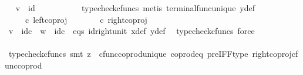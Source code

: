 \begin{isabellebody}
\ \isamarkupfalse%
\ {\isachardoublequoteopen}v\ {\isacharequal}{\kern0pt}\ id\ {\isasymone}{\isachardoublequoteclose}\isanewline
\ \ \ \ \ \ \ \ \isamarkupfalse%
\ {\isacharparenleft}{\kern0pt}typecheck{\isacharunderscore}{\kern0pt}cfuncs{\isacharcomma}{\kern0pt}\ metis\ terminal{\isacharunderscore}{\kern0pt}func{\isacharunderscore}{\kern0pt}unique\ y{\isacharunderscore}{\kern0pt}def{\isacharparenright}{\kern0pt}\isanewline
\ \ \ \ \ \ \isamarkupfalse%
\ \isamarkupfalse%
\ {\isachardoublequoteopen}{\isasymlangle}{\isasymt}{\isacharcomma}{\kern0pt}\ {\isasymt}{\isasymrangle}\ {\isasymamalg}{\isasymlangle}{\isasymf}{\isacharcomma}{\kern0pt}\ {\isasymf}{\isasymrangle}\ {\isasymcirc}\isactrlsub c\ left{\isacharunderscore}{\kern0pt}coproj\ {\isasymone}\ {\isasymone}\ {\isacharequal}{\kern0pt}\ {\isasymlangle}{\isasymt}{\isacharcomma}{\kern0pt}\ {\isasymt}{\isasymrangle}\ {\isasymamalg}{\isasymlangle}{\isasymf}{\isacharcomma}{\kern0pt}\ {\isasymf}{\isasymrangle}\ {\isasymcirc}\isactrlsub c\ right{\isacharunderscore}{\kern0pt}coproj\ {\isasymone}\ {\isasymone}{\isachardoublequoteclose}\isanewline
\ \ \ \ \ \ \ \ \isamarkupfalse%
\ {\isacartoucheopen}v\ {\isacharequal}{\kern0pt}\ id\isactrlsub c\ {\isasymone}{\isacartoucheclose}\ {\isacartoucheopen}w\ {\isacharequal}{\kern0pt}\ id\isactrlsub c\ {\isasymone}{\isacartoucheclose}\ eqs\ id{\isacharunderscore}{\kern0pt}right{\isacharunderscore}{\kern0pt}unit{}\ x{\isacharunderscore}{\kern0pt}def\ y{\isacharunderscore}{\kern0pt}def\ \isamarkupfalse%
\ {\isacharparenleft}{\kern0pt}typecheck{\isacharunderscore}{\kern0pt}cfuncs{\isacharcomma}{\kern0pt}\ force{\isacharparenright}{\kern0pt}\isanewline
\ \ \ \ \ \ \isamarkupfalse%
\ \isamarkupfalse%
\ {\isachardoublequoteopen}{\isasymlangle}{\isasymt}{\isacharcomma}{\kern0pt}\ {\isasymt}{\isasymrangle}\ {\isacharequal}{\kern0pt}\ {\isasymlangle}{\isasymf}{\isacharcomma}{\kern0pt}\ {\isasymf}{\isasymrangle}{\isachardoublequoteclose}\isanewline
\ \ \ \ \ \ \ \ \isamarkupfalse%
\ {\isacharparenleft}{\kern0pt}typecheck{\isacharunderscore}{\kern0pt}cfuncs{\isacharcomma}{\kern0pt}\ smt\ {\isacharparenleft}{\kern0pt}z{}{\isacharparenright}{\kern0pt}\ \ cfunc{\isacharunderscore}{\kern0pt}coprod{\isacharunderscore}{\kern0pt}unique\ coprod{\isacharunderscore}{\kern0pt}eq{}\ pre{\isacharunderscore}{\kern0pt}IFF{\isacharunderscore}{\kern0pt}type\ right{\isacharunderscore}{\kern0pt}coproj{\isacharunderscore}{\kern0pt}cfunc{\isacharunderscore}{\kern0pt}coprod{\isacharparenright}{\kern0pt}\ \ \ \ \ \ \isanewline

\end{isabellebody}
